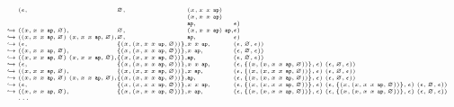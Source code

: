 \begin{displaymath}\tiny
  \begin{array}{l@{}l@{}l@{}l@{}l}
&(\epsilon, &\varnothing, &(x, x~x~\mathtt{ap})\\ &&& (x, x~x~\mathtt{ap}) \\ &&&\mathtt{ap}, &\epsilon)\\
\hookrightarrow{}&((x, x~x~\mathtt{ap}, \varnothing), &\varnothing, &(x, x~x~\mathtt{ap})~\mathtt{ap}, &\epsilon)\\
\hookrightarrow{}&((x, x~x~\mathtt{ap}, \varnothing)~(x, x~x~\mathtt{ap}, \varnothing), &\varnothing, &\mathtt{ap}, &\epsilon)\\
\hookrightarrow{}&(\epsilon, &\{(x, (x, x~x~\mathtt{ap}, \varnothing))\}, &x~x~\mathtt{ap}, &(\epsilon, \varnothing, \epsilon))\\
\hookrightarrow{}&((x, x~x~\mathtt{ap}, \varnothing), &\{(x, (x, x~x~\mathtt{ap}, \varnothing))\}, &x~\mathtt{ap}, &(\epsilon, \varnothing, \epsilon))\\
\hookrightarrow{}&((x, x~x~\mathtt{ap}, \varnothing)~(x, x~x~\mathtt{ap}, \varnothing), &\{(x, (x, x~x~\mathtt{ap}, \varnothing))\}, &\mathtt{ap}, &(\epsilon, \varnothing, \epsilon))\\
\hookrightarrow{}&(\epsilon, &\{(x, (x, x~x~\mathtt{ap}, \varnothing))\}, &x~x~\mathtt{ap}, &(\epsilon, \{(x, (x, x~x~\mathtt{ap}, \varnothing))\}, \epsilon)~(\epsilon, \varnothing, \epsilon))\\
\hookrightarrow{}&((x, x~x~\mathtt{ap}, \varnothing), &\{(x, (x, x~x~\mathtt{ap}, \varnothing))\}, &x~\mathtt{ap}, &(\epsilon, \{(x, (x, x~x~\mathtt{ap}, \varnothing))\}, \epsilon)~(\epsilon, \varnothing, \epsilon))\\
\hookrightarrow{}&((x, x~x~\mathtt{ap}, \varnothing)~(x, x~x~\mathtt{ap}, \varnothing), &\{(x, (x, x~x~\mathtt{ap}, \varnothing))\}, &\mathtt{ap}, &(\epsilon, \{(x, (x, x~x~\mathtt{ap}, \varnothing))\}, \epsilon)~(\epsilon, \varnothing, \epsilon))\\
\hookrightarrow{}&(\epsilon, &\{(x, (x, x~x~\mathtt{ap}, \varnothing))\}, &x~x~\mathtt{ap}, &(\epsilon, \{(x, (x, x~x~\mathtt{ap}, \varnothing))\}, \epsilon)~(\epsilon, \{(x, (x, x~x~\mathtt{ap}, \varnothing))\}, \epsilon)~(\epsilon, \varnothing, \epsilon))\\
\hookrightarrow{}&((x, x~x~\mathtt{ap}, \varnothing), &\{(x, (x, x~x~\mathtt{ap}, \varnothing))\}, &x~\mathtt{ap}, &(\epsilon, \{(x, (x, x~x~\mathtt{ap}, \varnothing))\}, \epsilon)~(\epsilon, \{(x, (x, x~x~\mathtt{ap}, \varnothing))\}, \epsilon)~(\epsilon, \varnothing, \epsilon))
\\
& \ldots
  \end{array}
\end{displaymath}
